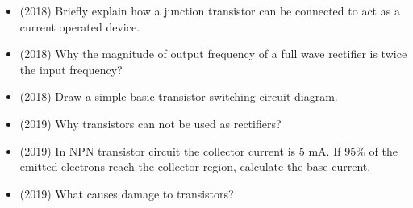 \documentclass{article}
\begin{document}
\begin{itemize}
\item (2018)  Briefly explain how a junction transistor can be connected to act as a current operated device. 
\item (2018)  Why the magnitude of output frequency of a full wave rectifier is twice the input frequency? 
\item (2018)  Draw a simple basic transistor switching circuit diagram. 
\item (2019)  Why transistors can not be used as rectifiers? 
\item (2019)  In NPN transistor circuit the collector current is $ 5$ mA. If $ 95\%$ of the emitted electrons reach the collector region, calculate the base current. 
\item (2019)  What causes damage to transistors? 
\end{itemize}
\end{document}
